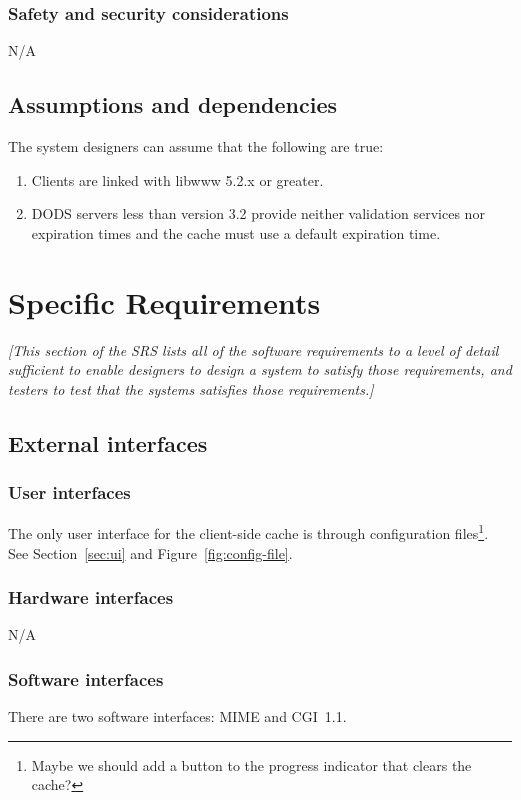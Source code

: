 \documentclass{article}
\begin{document}
\subsubsection{Safety and security considerations}
N/A

\subsection{Assumptions and dependencies}
\label{sec:assumptions}
The system designers can assume that the following are true:
\begin{enumerate}
\item Clients are linked with libwww 5.2.x or greater.
\item DODS servers less than version 3.2 provide neither validation services
  nor expiration times and the cache must use a default expiration time.
\end{enumerate}

\section{Specific Requirements}
\label{sec:specific}
\emph{[This section of the \ac{SRS} lists all of the software requirements to
  a level of detail sufficient to enable designers to design a system to
  satisfy those requirements, and testers to test that the systems satisfies
  those requirements.]}

\subsection{External interfaces}
\subsubsection{User interfaces}
The only user interface for the client-side cache is through configuration
files\footnote{Maybe we should add a button to the progress indicator that
  clears the cache?}. See Section~\ref{sec:ui}
and Figure~\ref{fig:config-file}. 

\subsubsection{Hardware interfaces}
N/A

\subsubsection{Software interfaces}
There are two software interfaces: MIME and \acs{CGI}~1.1\cite{w3c:cgi}. 
\end{document}
